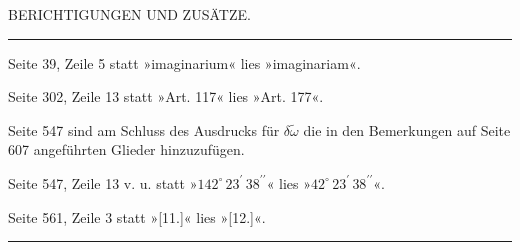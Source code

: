 \clearpage
\begingroup
{}
\renewcommand{\headrulewidth}{0pt}
\begin{center}\large BERICHTIGUNGEN UND ZUSÄTZE.\end{center}
\begin{center}\rule{.09\linewidth}{.4pt}\end{center}

\par\noindent\hspace*{\parindent}Seite 39, Zeile 5 statt »imaginarium« lies »imaginariam«.

\par\noindent\hspace*{\parindent}Seite 302, Zeile 13 statt »Art. 117« lies »Art. 177«.

\par\noindent\hspace*{\parindent}Seite 547 sind am Schluss des Ausdrucks für \(\delta\tilde{\omega}\) die in den Bemerkungen auf Seite 607 angeführten
Glieder hinzuzufügen.

\par\noindent\hspace*{\parindent}Seite 547, Zeile 13 v. u. statt »\(142^{\circ}\,23^{\prime}\,38^{\prime\prime}\)« lies »\(42^{\circ}\,23^{\prime}\,38^{\prime\prime}\)«.

\par\noindent\hspace*{\parindent}Seite 561, Zeile 3 statt »[11.]« lies »[12.]«.
\par\begin{center}\rule{.24\linewidth}{.4pt}\end{center}
\clearpage
\endgroup
